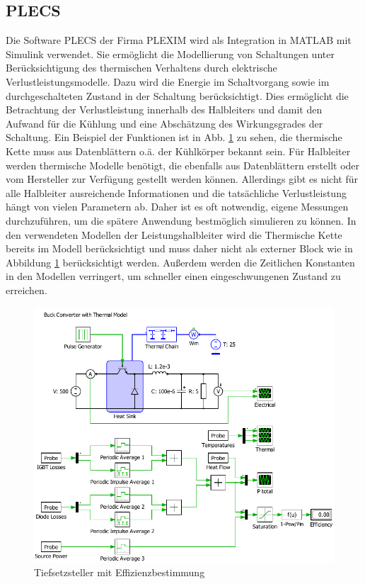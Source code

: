 	\subsection{PLECS}
	Die Software \gls{PLECS} der Firma PLEXIM wird als Integration in MATLAB mit Simulink verwendet.  Sie ermöglicht die Modellierung von Schaltungen unter Berücksichtigung des thermischen Verhaltens durch elektrische Verlustleistungsmodelle. Dazu wird die Energie im Schaltvorgang sowie im durchgeschalteten Zustand in der Schaltung berücksichtigt. Dies ermöglicht die Betrachtung der Verlustleistung innerhalb des Halbleiters und damit den Aufwand für die Kühlung und eine Abschätzung des Wirkungsgrades der Schaltung. Ein Beispiel der Funktionen ist in Abb. \ref{fig:plecsbuck} zu sehen, die thermische Kette muss aus Datenblättern o.ä. der Kühlkörper bekannt sein. Für Halbleiter werden thermische Modelle benötigt, die ebenfalls aus Datenblättern erstellt oder vom Hersteller zur Verfügung gestellt werden können. Allerdings gibt es nicht für alle Halbleiter ausreichende Informationen und die tatsächliche Verlustleistung hängt von vielen Parametern ab. Daher ist es oft notwendig, eigene Messungen durchzuführen, um die spätere Anwendung bestmöglich simulieren zu können. In den verwendeten Modellen der Leistungshalbleiter wird die Thermische Kette bereits im Modell berücksichtigt und muss daher nicht als externer Block wie in Abbildung \ref{fig:plecsbuck} berücksichtigt werden. Außerdem werden die Zeitlichen Konstanten in den Modellen verringert, um schneller einen eingeschwungenen Zustand zu erreichen. \\
	
	\begin{figure}
		\centering
		\includegraphics[width=1\linewidth]{content/Grafiken/PLECS_Buck}
		\caption[Tiefsetzsteller mit Effizienzbestimmung]{Tiefsetzsteller mit Effizienzbestimmung}
		\label{fig:plecsbuck}
	\end{figure}
	